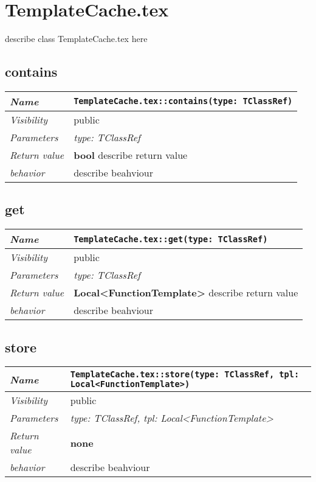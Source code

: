 \chapter{TemplateCache.tex}
describe class TemplateCache.tex here
\section{contains}
\begin{longtable}{p{3cm} @{\hskip 1cm} p{12cm}}
 \hline
\textit{Name} & \texttt{TemplateCache.tex::contains(type: TClassRef)}\\
\hline
 \textit{Visibility} & public\\
\hline
\textit{Parameters} & \textit{type: TClassRef}\\
\hline
\textit{Return value} & \textbf{ bool} describe return value\\
  \hline
 \textit{behavior} & describe beahviour \\
\hline
\end{longtable} \pagebreak
 \section{get}
\begin{longtable}{p{3cm} @{\hskip 1cm} p{12cm}}
 \hline
\textit{Name} & \texttt{TemplateCache.tex::get(type: TClassRef)}\\
\hline
 \textit{Visibility} & public\\
\hline
\textit{Parameters} & \textit{type: TClassRef}\\
\hline
\textit{Return value} & \textbf{ Local<FunctionTemplate>} describe return value\\
  \hline
 \textit{behavior} & describe beahviour \\
\hline
\end{longtable} \pagebreak
 \section{store}
\begin{longtable}{p{3cm} @{\hskip 1cm} p{12cm}}
 \hline
\textit{Name} & \texttt{TemplateCache.tex::store(type: TClassRef, tpl: Local<FunctionTemplate>)}\\
\hline
 \textit{Visibility} & public\\
\hline
\textit{Parameters} & \textit{type: TClassRef, tpl: Local<FunctionTemplate>}\\
\hline
\textit{Return value} & \textbf{none}\\
  \hline
 \textit{behavior} & describe beahviour \\
\hline
\end{longtable} \pagebreak
 